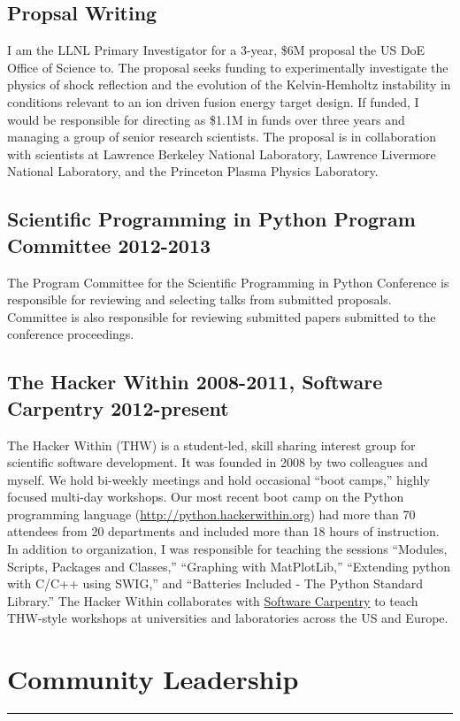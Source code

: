 \documentclass[letterpaper,11pt]{article}
\begin{document}
\subsection*{Propsal Writing}
I am the LLNL Primary Investigator for a 3-year, \$6M proposal the US DoE
Office of Science to.  The proposal seeks funding to  experimentally investigate
the physics of shock reflection and the evolution of the Kelvin-Hemholtz
instability in conditions relevant to an ion driven fusion energy target
design.  If funded, I would be responsible for directing as \$1.1M in funds
over three years and managing a group of senior research scientists.  The
proposal is in collaboration with scientists at Lawrence Berkeley National
Laboratory, Lawrence Livermore National Laboratory, and the Princeton Plasma
Physics Laboratory.

\subsection*{Scientific Programming in Python Program Committee 2012-2013}
The Program Committee for the Scientific Programming in Python Conference is
responsible for reviewing and selecting talks from submitted proposals.
Committee is also responsible for reviewing submitted papers submitted to the
conference proceedings.

\subsection*{The Hacker Within 2008-2011, Software Carpentry 2012-present}
The Hacker Within (THW) is a student-led, skill sharing interest group for
scientific software development.  It was founded in 2008 by two colleagues and
myself.  We hold bi-weekly meetings and hold occasional ``boot camps,'' highly
focused multi-day workshops.  Our most recent boot camp on the Python
programming language (\url{http://python.hackerwithin.org}) had more than 70
attendees from 20 departments and included more than 18 hours of instruction.
In addition to organization, I was responsible for teaching the sessions
``Modules, Scripts, Packages and Classes,''  ``Graphing with MatPlotLib,''
``Extending python with C/C++ using SWIG,''  and ``Batteries Included - The
Python Standard Library.''  The Hacker Within collaborates with
\href{software-carpentry.org}{Software Carpentry} to teach THW-style workshops
at universities and laboratories across the US and Europe.

\section*{Community Leadership}
\hrule
\vspace{0.05in}
\end{document}
